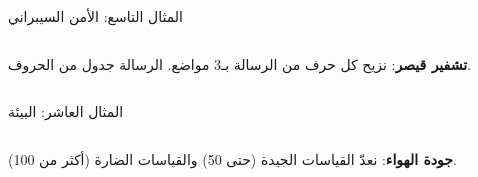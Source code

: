 \begin{frame}[t]{المثال التاسع: الأمن السيبراني}
    \begin{columns}[T]
        {\small\textbf{تشفير قيصر}: نزيح كل حرف من الرسالة بـ3 مواضع. الرسالة جدول من الحروف.\par}
        \vspace{0.3cm}
    \end{columns}
\end{frame}

\begin{frame}[t]{المثال العاشر: البيئة}
    \begin{columns}[T]
        {\small\textbf{جودة الهواء}: نعدّ القياسات الجيدة (حتى 50) والقياسات الضارة (أكثر من 100).\par}
        \vspace{0.3cm}
    \end{columns}
\end{frame}
